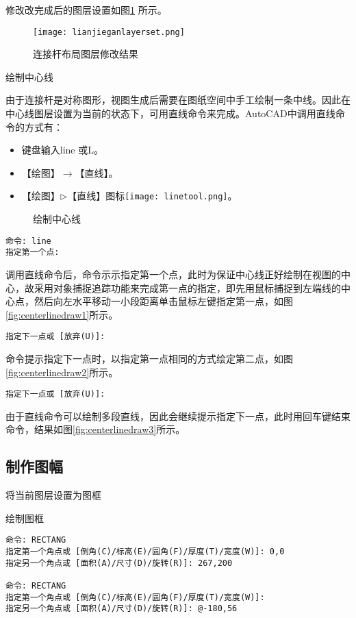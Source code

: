 \begin{procedure}
修改改完成后的图层设置如图\ref{fig:lianjieganlayerset} 所示。
\begin{figure}[htbp]
\centering
\texttt{[image: lianjieganlayerset.png]}
\caption{连接杆布局图层修改结果}\label{fig:lianjieganlayerset}
\end{figure}
\item 绘制中心线

由于连接杆是对称图形，视图生成后需要在图纸空间中手工绘制一条中线。因此在中心线图层设置为当前的状态下，可用直线命令来完成。AutoCAD中调用直线命令的方式有：
\begin{itemize}
\item 键盘输入line 或L。
\item 【绘图】$\rightarrow$【直线】。
\item 【绘图】$\triangleright$【直线】图标\texttt{[image: linetool.png]}。
\end{itemize}

\begin{figure}[htbp]
\centering
{}\hspace{20pt}
\hspace{20pt}
\caption{绘制中心线}
\end{figure}

\begin{lstlisting}
命令: line
指定第一个点:
\end{lstlisting}
调用直线命令后，命令示示指定第一个点，此时为保证中心线正好绘制在视图的中心，故采用对象捕捉追踪功能来完成第一点的指定，即先用鼠标捕捉到左端线的中心点，然后向左水平移动一小段距离单击鼠标左键指定第一点，如图\ref{fig:centerlinedraw1}所示。
\begin{lstlisting}
指定下一点或 [放弃(U)]:
\end{lstlisting}
命令提示指定下一点时，以指定第一点相同的方式绘定第二点，如图\ref{fig:centerlinedraw2}所示。
\begin{lstlisting}
指定下一点或 [放弃(U)]:
\end{lstlisting}
由于直线命令可以绘制多段直线，因此会继续提示指定下一点，此时用回车键结束命令，结果如图\ref{fig:centerlinedraw3}所示。
\end{procedure}
\subsection{制作图幅}
\begin{procedure}
\item 将当前图层设置为图框
\item 绘制图框

\begin{lstlisting}
命令: RECTANG
指定第一个角点或 [倒角(C)/标高(E)/圆角(F)/厚度(T)/宽度(W)]: 0,0
指定另一个角点或 [面积(A)/尺寸(D)/旋转(R)]: 267,200

命令: RECTANG
指定第一个角点或 [倒角(C)/标高(E)/圆角(F)/厚度(T)/宽度(W)]:
指定另一个角点或 [面积(A)/尺寸(D)/旋转(R)]: @-180,56
\end{lstlisting}
\end{procedure}
